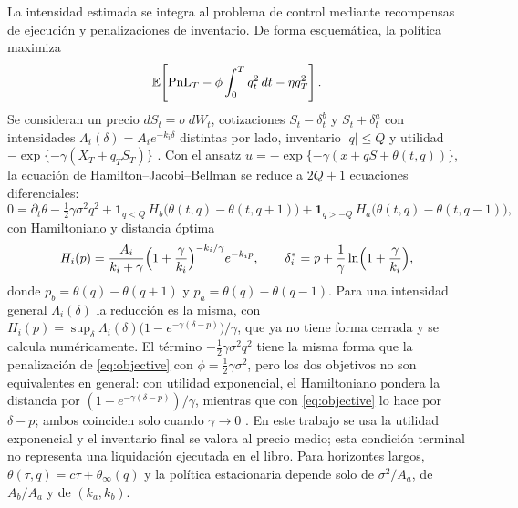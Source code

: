 La intensidad estimada se integra al problema de control mediante recompensas de ejecución y penalizaciones de inventario. De forma esquemática, la política maximiza
\begin{equation}
 \operatorname{\mathbb{E}}\!\left[\mathrm{PnL}_T-\phi\int_0^T q_t^2\,dt-\eta q_T^2\right].
 \label{eq:objective}
\end{equation}
Se consideran un precio $dS_t=\sigma\,dW_t$, cotizaciones $S_t-\delta^b_t$ y $S_t+\delta^a_t$ con intensidades $\Lambda_i(\delta)=A_ie^{-k_i\delta}$ distintas por lado, inventario $|q|\le Q$ y utilidad $-\exp\{-\gamma(X_T+q_TS_T)\}$ \citep{GuentLehalle2013,Gueant2017,CarteaEtAl2015}. Con el ansatz $u=-\exp\{-\gamma(x+qS+\theta(t,q))\}$, la ecuación de Hamilton--Jacobi--Bellman se reduce a $2Q+1$ ecuaciones diferenciales:
\begin{equation}
0=\partial_t\theta-\tfrac12\gamma\sigma^2q^2+\mathbf 1_{q<Q}\,H_b\bigl(\theta(t,q)-\theta(t,q+1)\bigr)+\mathbf 1_{q>-Q}\,H_a\bigl(\theta(t,q)-\theta(t,q-1)\bigr),
\label{eq:hjb-theta}
\end{equation}
con Hamiltoniano y distancia óptima
\begin{equation}
H_i(p)=\frac{A_i}{k_i+\gamma}\Bigl(1+\frac{\gamma}{k_i}\Bigr)^{-k_i/\gamma}e^{-k_ip},\qquad
\delta_i^*=p+\frac1\gamma\ln\Bigl(1+\frac{\gamma}{k_i}\Bigr),
\label{eq:hjb-H}
\end{equation}
donde $p_b=\theta(q)-\theta(q+1)$ y $p_a=\theta(q)-\theta(q-1)$. Para una intensidad general $\Lambda_i(\delta)$ la reducción es la misma, con $H_i(p)=\sup_\delta\Lambda_i(\delta)\bigl(1-e^{-\gamma(\delta-p)}\bigr)/\gamma$, que ya no tiene forma cerrada y se calcula numéricamente. El término $-\tfrac12\gamma\sigma^2q^2$ tiene la misma forma que la penalización de \eqref{eq:objective} con $\phi=\tfrac12\gamma\sigma^2$, pero los dos objetivos no son equivalentes en general: con utilidad exponencial, el Hamiltoniano pondera la distancia por $(1-e^{-\gamma(\delta-p)})/\gamma$, mientras que con \eqref{eq:objective} lo hace por $\delta-p$; ambos coinciden solo cuando $\gamma\to0$ \citep{Gueant2017}. En este trabajo se usa la utilidad exponencial y el inventario final se valora al precio medio; esta condición terminal no representa una liquidación ejecutada en el libro. Para horizontes largos, $\theta(\tau,q)=c\tau+\theta_\infty(q)$ y la política estacionaria depende solo de $\sigma^2/A_a$, de $A_b/A_a$ y de $(k_a,k_b)$.

